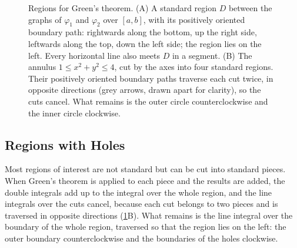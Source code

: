 \begin{figure}
{}
\caption{Regions for Green's theorem. (A) A standard region $D$ between the graphs of $\varphi_1$ and $\varphi_2$ over $[a,b]$, with its positively oriented boundary path: rightwards along the bottom, up the right side, leftwards along the top, down the left side; the region lies on the left. Every horizontal line also meets $D$ in a segment. (B) The annulus $1\le x^2+y^2\le4$, cut by the axes into four standard regions. Their positively oriented boundary paths traverse each cut twice, in opposite directions (grey arrows, drawn apart for clarity), so the cuts cancel. What remains is the outer circle counterclockwise and the inner circle clockwise.}
\label{fig:green}
\end{figure}

\subsection{Regions with Holes}

Most regions of interest are not standard but can be cut into standard pieces. When Green's theorem is applied to each piece and the results are added, the double integrals add up to the integral over the whole region, and the line integrals over the cuts cancel, because each cut belongs to two pieces and is traversed in opposite directions (\cref{fig:green}B). What remains is the line integral over the boundary of the whole region, traversed so that the region lies on the left: the outer boundary counterclockwise and the boundaries of the holes clockwise.

